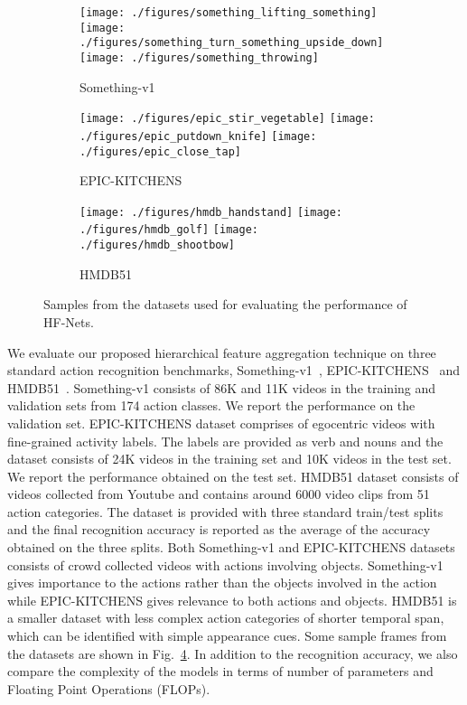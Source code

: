 \documentclass[journal,onecolumn]{IEEEtran}
\begin{document}
\begin{figure}[t]
	\centering
		\begin{subfigure}[b]{0.3\textwidth}
		\texttt{[image: ./figures/something\_lifting\_something]}
		\texttt{[image: ./figures/something\_turn\_something\_upside\_down]}
		\texttt{[image: ./figures/something\_throwing]}
		\caption{Something-v1}
		\label{fig:something}
		\end{subfigure}\hskip3mm
		\begin{subfigure}[b]{0.3\textwidth}
    	\texttt{[image: ./figures/epic\_stir\_vegetable]}
    	\texttt{[image: ./figures/epic\_putdown\_knife]}
    	\texttt{[image: ./figures/epic\_close\_tap]}
    	\caption{EPIC-KITCHENS}
    	\label{fig:epic}
    	\end{subfigure}\hskip3mm
		\begin{subfigure}[b]{0.3\textwidth}
		\texttt{[image: ./figures/hmdb\_handstand]}
		\texttt{[image: ./figures/hmdb\_golf]}
		\texttt{[image: ./figures/hmdb\_shootbow]}
		\caption{HMDB51}
		\label{fig:hmdb}
		\end{subfigure}
		\caption{Samples from the datasets used for evaluating the performance of HF-Nets.}\label{fig:dataset_samples}
\end{figure}

We evaluate our proposed hierarchical feature aggregation technique on three standard action recognition benchmarks, Something-v1~\cite{goyal2017something}, EPIC-KITCHENS~\cite{damen2018scaling} and HMDB51~\cite{kuehne2013hmdb51}.  Something-v1 consists of 86K and 11K videos in the training and validation sets from 174 action classes. We report the performance on the validation set. EPIC-KITCHENS dataset comprises of egocentric videos with fine-grained activity labels. The labels are provided as verb and nouns and the dataset consists of 24K videos in the training set and 10K videos in the test set. We report the performance obtained on the test set. HMDB51 dataset consists of videos collected from Youtube and contains around 6000 video clips from 51 action categories. The dataset is provided with three standard train/test splits and the final recognition accuracy is reported as the average of the accuracy obtained on the three splits.
Both Something-v1 and EPIC-KITCHENS datasets consists of crowd collected videos with actions involving objects. Something-v1 gives importance to the actions rather than the objects involved in the action while EPIC-KITCHENS gives relevance to both actions and objects. HMDB51 is a smaller dataset with less complex action categories of shorter temporal span, which can be identified with simple appearance cues. Some sample frames from the datasets are shown in Fig.~\ref{fig:dataset_samples}. In addition to the recognition accuracy, we also compare the complexity of the models in terms of number of parameters and Floating Point Operations (FLOPs). 
\end{document}
